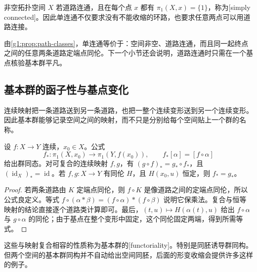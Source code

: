 \begin{definition}\label{g1:def:simply-connected}
	非空拓扑空间 \(X\) 若道路连通，且在每个点 \(x\) 都有 \(\pi_1(X,x)=\{1\}\)，称为[simply connected]。因此单连通不仅要求没有不能收缩的环路，也要求任意两点可以用道路连接。
\end{definition}

由\cref{g1:prop:path-classes}，单连通等价于：空间非空、道路连通，而且同一起终点之间的任意两条道路定端点同伦。下一个小节还会说明，道路连通时只需在一个基点核验基本群平凡。

\subsection{基本群的函子性与基点变化}
\label{g1:subsec:0501:02}

连续映射把一条道路送到另一条道路，也把一整个连续变形送到另一个连续变形。因此基本群能够记录空间之间的映射，而不只是分别给每个空间贴上一个群的名称。

\begin{proposition}\label{g1:prop:homotopy-functor}
	设 \(f:X\rightarrow Y\) 连续，\(x_0\in X\)。公式
	\[
		f_*:\pi_1(X,x_0)\longrightarrow\pi_1(Y,f(x_0)),\qquad
		f_*[\alpha]=[f\circ\alpha]
	\]
	给出群同态。对可复合的连续映射 \(f,g\)，有 \((g\circ f)_*=g_*\circ f_*\)，且 \((\operatorname{id}_X)_*=\operatorname{id}\)。若 \(f,g:X\rightarrow Y\) 有同伦 \(H\)，且 \(H(x_0,u)\) 恒定，则 \(f_*=g_*\)。
\end{proposition}
\begin{proof}
	若两条道路由 \(K\) 定端点同伦，则 \(f\circ K\) 是像道路之间的定端点同伦，所以公式良定义。等式 \(f\circ(\alpha*\beta)=(f\circ\alpha)*(f\circ\beta)\) 说明它保乘法。复合与恒等映射的结论直接逐个道路类计算即可。最后，\((t,u)\mapsto H(\alpha(t),u)\) 给出 \(f\circ\alpha\) 与 \(g\circ\alpha\) 的同伦；由于基点在整个变形中固定，这个同伦固定两端，得到所需等式。
\end{proof}

这些与映射复合相容的性质称为基本群的[functoriality]。特别是同胚诱导群同构。但两个空间的基本群同构并不自动给出空间同胚，后面的形变收缩会提供许多这样的例子。

